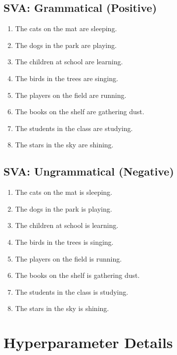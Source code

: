 \documentclass{article}
\begin{document}
\subsection{SVA: Grammatical (Positive)}
\begin{enumerate}
\item The cats on the mat are sleeping.
\item The dogs in the park are playing.
\item The children at school are learning.
\item The birds in the trees are singing.
\item The players on the field are running.
\item The books on the shelf are gathering dust.
\item The students in the class are studying.
\item The stars in the sky are shining.
\end{enumerate}

\subsection{SVA: Ungrammatical (Negative)}
\begin{enumerate}
\item The cats on the mat is sleeping.
\item The dogs in the park is playing.
\item The children at school is learning.
\item The birds in the trees is singing.
\item The players on the field is running.
\item The books on the shelf is gathering dust.
\item The students in the class is studying.
\item The stars in the sky is shining.
\end{enumerate}

\section{Hyperparameter Details}
\label{app:hyperparams}
\end{document}
